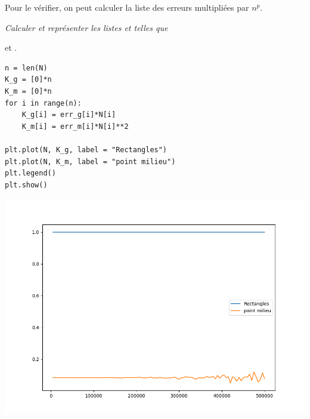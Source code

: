 Pour le vérifier, on peut calculer la liste des erreurs multipliées par $n^p$.
\begin{Exercise}\it
Calculer et représenter les listes  et  telles que 

 et .
\end{Exercise}
\begin{Answer}
\begin{lstlisting}
n = len(N)
K_g = [0]*n
K_m = [0]*n
for i in range(n):
    K_g[i] = err_g[i]*N[i]
    K_m[i] = err_m[i]*N[i]**2
    
plt.plot(N, K_g, label = "Rectangles")
plt.plot(N, K_m, label = "point milieu")
plt.legend()
plt.show()
\end{lstlisting}
\begin{center}
\includegraphics[scale=0.5]{TP/Images/TP18_err_K.png}
\end{center}
\end{Answer}
